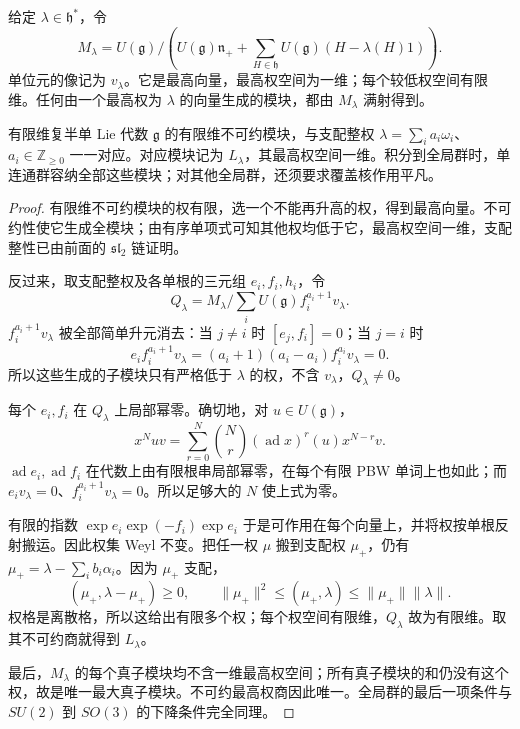 \begin{definition}[Verma 模块]
给定 $\lambda\in\mathfrak h^*$，令
\[
 M_\lambda=U(\mathfrak g)\Big/
 \left(U(\mathfrak g)\mathfrak n_+
 +\sum_{H\in\mathfrak h}U(\mathfrak g)(H-\lambda(H)1)\right).
\]
单位元的像记为 $v_\lambda$。它是最高向量，最高权空间为一维；每个较低权空间有限维。任何由一个最高权为 $\lambda$ 的向量生成的模块，都由 $M_\lambda$ 满射得到。
\end{definition}

\begin{theorem}[最高权分类的构造与唯一性]
有限维复半单 Lie 代数 $\mathfrak g$ 的有限维不可约模块，与支配整权 $\lambda=\sum_i a_i\omega_i$、$a_i\in\mathbb Z_{\ge0}$ 一一对应。对应模块记为 $L_\lambda$，其最高权空间一维。积分到全局群时，单连通群容纳全部这些模块；对其他全局群，还须要求覆盖核作用平凡。
\end{theorem}
\begin{proof}
有限维不可约模块的权有限，选一个不能再升高的权，得到最高向量。不可约性使它生成全模块；由有序单项式可知其他权均低于它，最高权空间一维，支配整性已由前面的 $\mathfrak{sl}_2$ 链证明。

反过来，取支配整权及各单根的三元组 $e_i,f_i,h_i$，令
\[
 Q_\lambda=M_\lambda\Big/\sum_iU(\mathfrak g)f_i^{a_i+1}v_\lambda.
\]
$f_i^{a_i+1}v_\lambda$ 被全部简单升元消去：当 $j\ne i$ 时 $[e_j,f_i]=0$；当 $j=i$ 时
\[
 e_i f_i^{a_i+1}v_\lambda
 =(a_i+1)(a_i-a_i)f_i^{a_i}v_\lambda=0.
\]
所以这些生成的子模块只有严格低于 $\lambda$ 的权，不含 $v_\lambda$，$Q_\lambda\ne0$。

每个 $e_i,f_i$ 在 $Q_\lambda$ 上局部幂零。确切地，对 $u\in U(\mathfrak g)$，
\[
 x^Nu v=\sum_{r=0}^N\binom Nr(\operatorname{ad}x)^r(u)x^{N-r}v.
\]
$\operatorname{ad}e_i,\operatorname{ad}f_i$ 在代数上由有限根串局部幂零，在每个有限 PBW 单词上也如此；而 $e_iv_\lambda=0$、$f_i^{a_i+1}v_\lambda=0$。所以足够大的 $N$ 使上式为零。

有限的指数 $\exp e_i\exp(-f_i)\exp e_i$ 于是可作用在每个向量上，并将权按单根反射搬运。因此权集 Weyl 不变。把任一权 $\mu$ 搬到支配权 $\mu_+$，仍有 $\mu_+=\lambda-\sum_i b_i\alpha_i$。因为 $\mu_+$ 支配，
\[
 (\mu_+,\lambda-\mu_+)\ge0,
 \qquad \|\mu_+\|^2\le(\mu_+,\lambda)\le\|\mu_+\|\|\lambda\|.
\]
权格是离散格，所以这给出有限多个权；每个权空间有限维，$Q_\lambda$ 故为有限维。取其不可约商就得到 $L_\lambda$。

最后，$M_\lambda$ 的每个真子模块均不含一维最高权空间；所有真子模块的和仍没有这个权，故是唯一最大真子模块。不可约最高权商因此唯一。全局群的最后一项条件与 $SU(2)$ 到 $SO(3)$ 的下降条件完全同理。
\end{proof}

